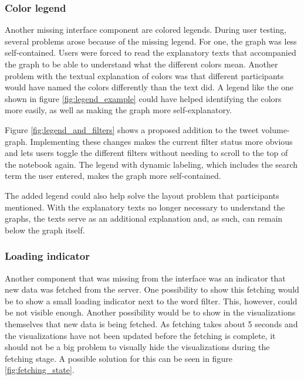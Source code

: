 \subsubsection*{Color legend}
Another missing interface component are colored legends. During user testing, several problems arose because of the missing legend. For one, the graph was less self-contained. Users were forced to read the explanatory texts that accompanied the graph to be able to understand what the different colors mean. Another problem with the textual explanation of colors was that different participants would have named the colors differently than the text did. A legend like the one shown in figure \ref{fig:legend_example} could have helped identifying the colors more easily, as well as making the graph more self-explanatory.

Figure \ref{fig:legend_and_filters} shows a proposed addition to the tweet volume-graph. Implementing these changes makes the current filter status more obvious and lets users toggle the different filters without needing to scroll to the top of the notebook again. The legend with dynamic labeling, which includes the search term the user entered, makes the graph more self-contained.

The added legend could also help solve the layout problem that participants mentioned. With the explanatory texts no longer necessary to understand the graphs, the texts serve as an additional explanation and, as such, can remain below the graph itself.

\subsubsection*{Loading indicator}
Another component that was missing from the interface was an indicator that new data was fetched from the server. One possibility to show this fetching would be to show a small loading indicator next to the word filter. This, however, could be not visible enough. Another possibility would be to show in the visualizations themselves that new data is being fetched. As fetching takes about 5 seconds and the visualizations have not been updated before the fetching is complete, it should not be a big problem to visually hide the visualizations during the fetching stage. A possible solution for this can be seen in figure \ref{fig:fetching_state}.

